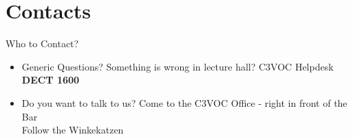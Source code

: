 \documentclass[aspectratio=169]{beamer}
\begin{document}
\section{Contacts}			%
\begin{frame}{Who to Contact?}
\begin{itemize}
	\item Generic Questions? Something is wrong in lecture hall? C3VOC Helpdesk \textbf{DECT 1600}
	\item Do you want to talk to us? Come to the C3VOC Office - right in front of the Bar \\
	Follow the Winkekatzen
\end{itemize} 
\end{frame}


\end{document}
